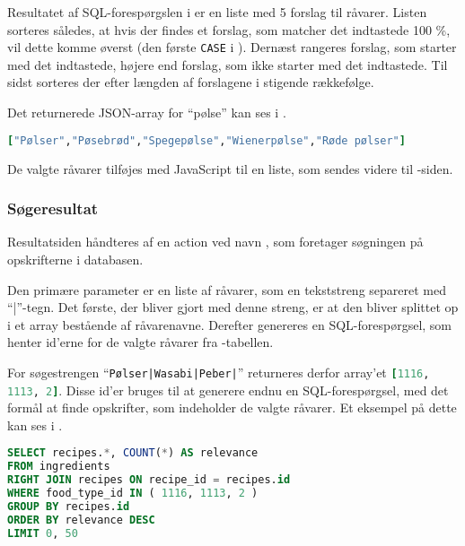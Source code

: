 Resultatet af SQL-forespørgslen i  er en liste med 5 forslag til råvarer. Listen sorteres således, at hvis der findes et forslag, som matcher det indtastede 100 \%, vil dette komme øverst (den første \texttt{CASE} i ). Dernæst rangeres forslag, som starter med det indtastede, højere end forslag, som ikke starter med det indtastede. Til sidst sorteres der efter længden af forslagene i stigende rækkefølge.

Det returnerede JSON-array for ``pølse'' kan ses i .

\begin{lstlisting}[caption={Et returneret JSON-array for ``pølse''.},label=lst:poelse-json,language=Ruby]
["Pølser","Pøsebrød","Spegepølse","Wienerpølse","Røde pølser"]
\end{lstlisting}

De valgte råvarer tilføjes med JavaScript til en liste, som sendes videre til -siden.

\subsubsection{Søgeresultat}
Resultatsiden håndteres af en action ved navn , som foretager søgningen på opskrifterne i databasen. 

Den primære parameter er en liste af råvarer, som en tekststreng separeret med ``|''-tegn. Det første, der bliver gjort med denne streng, er at den bliver splittet op i et array bestående af råvarenavne. Derefter genereres en SQL-forespørgsel, som henter id'erne for de valgte råvarer fra -tabellen.

For søgestrengen ``\texttt{Pølser|Wasabi|Peber|}'' returneres derfor array'et \lstinline[language=Ruby]{[1116, 1113, 2]}. Disse id'er bruges til at generere endnu en SQL-forespørgsel, med det formål at finde opskrifter, som indeholder de valgte råvarer. Et eksempel på dette kan ses i .

\begin{lstlisting}[caption={Ved en søgning på ``Pølser'', ``Wasabi'' og ``Peber'' udføres denne SQL-forespørgsel.},label=lst:soegeresultat-sql,language=SQL]
SELECT recipes.*, COUNT(*) AS relevance
FROM ingredients
RIGHT JOIN recipes ON recipe_id = recipes.id
WHERE food_type_id IN ( 1116, 1113, 2 )
GROUP BY recipes.id
ORDER BY relevance DESC
LIMIT 0, 50
\end{lstlisting}

